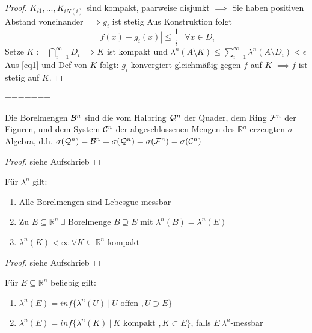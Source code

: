 \begin{proof}
	$K_{i1}, ...,K_{iN(i)}$ sind kompakt, paarweise disjunkt \newline 
	$\implies$ Sie haben positiven Abstand voneinander \newline
	$\implies g_i$ ist stetig \newline
	Aus Konstruktion folgt \begin{equation}
	|f(x) - g_i(x)| \leq \frac{1}{i} \text{ } \forall x\in D_i
	\label{eq1}
	\end{equation}
	Setze $K:= \bigcap\limits_{i=1}^{\infty} D_i \implies K$ ist kompakt und $\lambda^n(A\setminus K) \leq \sum\limits_{i=1}^{\infty}\lambda^n(A\setminus D_i) < \epsilon$ \newline
	Aus \ref{eq1} und Def von $K$ folgt: $g_i$ konvergiert gleichmäßig gegen $f$ auf $K$ $\implies f$ ist stetig auf $K$. 
	\end{proof}
=======

  \begin{lemma}
    Die Borelmengen $\mathcal{B}^n$ sind die vom Halbring $\mathcal{Q}^n$ der Quader, dem Ring $\mathcal{F}^n$ der Figuren, und dem System $\mathcal{C}^n$ der abgeschlossenen Mengen des $\mathbb{R}^n$ erzeugten $\sigma$-Algebra, d.h. $\sigma(\mathcal{Q}^n) = \mathcal{B}^n = \sigma(\mathcal{Q}^n) = \sigma(\mathcal{F}^n) = \sigma(\mathcal{C}^n)$
  \end{lemma}

  \begin{proof}
    siehe Aufschrieb
  \end{proof}

  \newpage
  \begin{theorem}
    Für $\lambda^n$ gilt:
    \begin{enumerate}
      \item Alle Borelmengen sind Lebesgue-messbar 
      \item Zu $E \subseteq \mathbb{R}^n \ \exists$ Borelmenge $B \supseteq E$ mit $\lambda^n(B) = \lambda^n(E)$
      \item $\lambda^n(K) < \infty \ \forall K \subseteq \mathbb{R}^n$ kompakt
    \end{enumerate}
  \end{theorem}

  \begin{proof}
    siehe Aufschrieb
  \end{proof}

  \begin{lemma}
    Für $E \subseteq \mathbb{R}^n$ beliebig gilt:
    \begin{enumerate}[label=\roman*)]
      \item $\lambda^n(E) = inf\{\lambda^n(U) \ | \ U \text{ offen }, U \supset E\}$
      \item $\lambda^n(E) = inf\{\lambda^n(K) \ | \ K \text{ kompakt }, K \subset E\}$, falls $E \ \lambda^n$-messbar
    \end{enumerate}
  \end{lemma}

